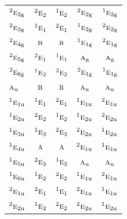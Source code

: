 \documentclass[10pt,a4paper]{article}
\numberwithin{equation}{section}
\newcommand{\irr}[1]{\text{\normalfont\scshape #1}}
\newcommand{\conjpair}[1]{{}^{#1}}
\newcommand{\ptag}[1]{\mathrm{#1}}
\begin{document}
{\begin{longtable}{@{}lcccc@{}}
$\conjpair{2}\irr{e}_{2\ptag{g}}$ & $\conjpair{2}\irr{e}_{2}$ & $\conjpair{1}\irr{e}_{2}$ & $\conjpair{2}\irr{e}_{2\ptag{g}}$ & $\conjpair{1}\irr{e}_{2\ptag{g}}$\\
$\conjpair{2}\irr{e}_{3\ptag{g}}$ & $\conjpair{1}\irr{e}_{1}$ & $\conjpair{2}\irr{e}_{1}$ & $\conjpair{1}\irr{e}_{2\ptag{g}}$ & $\conjpair{2}\irr{e}_{2\ptag{g}}$\\
$\conjpair{2}\irr{e}_{4\ptag{g}}$ & $\irr{b}$ & $\irr{b}$ & $\conjpair{1}\irr{e}_{1\ptag{g}}$ & $\conjpair{2}\irr{e}_{1\ptag{g}}$\\
$\conjpair{2}\irr{e}_{5\ptag{g}}$ & $\conjpair{2}\irr{e}_{1}$ & $\conjpair{1}\irr{e}_{1}$ & $\irr{a}_{\ptag{g}}$ & $\irr{a}_{\ptag{g}}$\\
$\conjpair{2}\irr{e}_{6\ptag{g}}$ & $\conjpair{1}\irr{e}_{2}$ & $\conjpair{2}\irr{e}_{2}$ & $\conjpair{2}\irr{e}_{1\ptag{g}}$ & $\conjpair{1}\irr{e}_{1\ptag{g}}$\\
$\irr{a}_{\ptag{u}}$ & $\irr{b}$ & $\irr{b}$ & $\irr{a}_{\ptag{u}}$ & $\irr{a}_{\ptag{u}}$\\
$\conjpair{1}\irr{e}_{1\ptag{u}}$ & $\conjpair{1}\irr{e}_{1}$ & $\conjpair{2}\irr{e}_{1}$ & $\conjpair{1}\irr{e}_{1\ptag{u}}$ & $\conjpair{2}\irr{e}_{1\ptag{u}}$\\
$\conjpair{1}\irr{e}_{2\ptag{u}}$ & $\conjpair{2}\irr{e}_{2}$ & $\conjpair{1}\irr{e}_{2}$ & $\conjpair{1}\irr{e}_{2\ptag{u}}$ & $\conjpair{2}\irr{e}_{2\ptag{u}}$\\
$\conjpair{1}\irr{e}_{3\ptag{u}}$ & $\conjpair{1}\irr{e}_{3}$ & $\conjpair{2}\irr{e}_{3}$ & $\conjpair{2}\irr{e}_{2\ptag{u}}$ & $\conjpair{1}\irr{e}_{2\ptag{u}}$\\
$\conjpair{1}\irr{e}_{4\ptag{u}}$ & $\irr{a}$ & $\irr{a}$ & $\conjpair{2}\irr{e}_{1\ptag{u}}$ & $\conjpair{1}\irr{e}_{1\ptag{u}}$\\
$\conjpair{1}\irr{e}_{5\ptag{u}}$ & $\conjpair{2}\irr{e}_{3}$ & $\conjpair{1}\irr{e}_{3}$ & $\irr{a}_{\ptag{u}}$ & $\irr{a}_{\ptag{u}}$\\
$\conjpair{1}\irr{e}_{6\ptag{u}}$ & $\conjpair{1}\irr{e}_{2}$ & $\conjpair{2}\irr{e}_{2}$ & $\conjpair{1}\irr{e}_{1\ptag{u}}$ & $\conjpair{2}\irr{e}_{1\ptag{u}}$\\
$\conjpair{2}\irr{e}_{1\ptag{u}}$ & $\conjpair{2}\irr{e}_{1}$ & $\conjpair{1}\irr{e}_{1}$ & $\conjpair{2}\irr{e}_{1\ptag{u}}$ & $\conjpair{1}\irr{e}_{1\ptag{u}}$\\
$\conjpair{2}\irr{e}_{2\ptag{u}}$ & $\conjpair{1}\irr{e}_{2}$ & $\conjpair{2}\irr{e}_{2}$ & $\conjpair{2}\irr{e}_{2\ptag{u}}$ & $\conjpair{1}\irr{e}_{2\ptag{u}}$\\

\end{longtable}}
\end{document}
